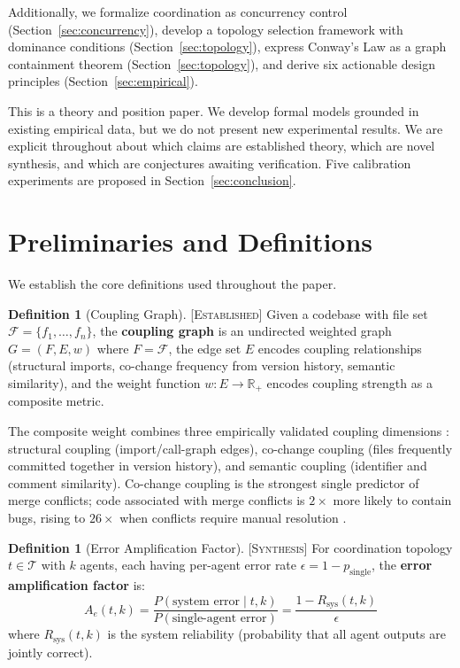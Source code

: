 \documentclass[11pt]{article}
\theoremstyle{definition}
\newtheorem{definition}[theorem]{Definition}
\theoremstyle{remark}
\newcommand{\established}{\textsc{[Established]}}
\newcommand{\synthesis}{\textsc{[Synthesis]}}
\begin{document}
Additionally, we formalize coordination as concurrency control (Section~\ref{sec:concurrency}), develop a topology selection framework with dominance conditions (Section~\ref{sec:topology}), express Conway's Law as a graph containment theorem (Section~\ref{sec:topology}), and derive six actionable design principles (Section~\ref{sec:empirical}).

This is a theory and position paper.
We develop formal models grounded in existing empirical data, but we do not present new experimental results.
We are explicit throughout about which claims are established theory, which are novel synthesis, and which are conjectures awaiting verification.
Five calibration experiments are proposed in Section~\ref{sec:conclusion}.


\section{Preliminaries and Definitions}
\label{sec:prelim}

We establish the core definitions used throughout the paper.

\begin{definition}[Coupling Graph] \established{}
\label{def:coupling-graph}
Given a codebase with file set $\mathcal{F} = \{f_1, \ldots, f_n\}$, the \textbf{coupling graph} is an undirected weighted graph $G = (F, E, w)$ where $F = \mathcal{F}$, the edge set $E$ encodes coupling relationships (structural imports, co-change frequency from version history, semantic similarity), and the weight function $w: E \to \mathbb{R}_+$ encodes coupling strength as a composite metric.
\end{definition}

The composite weight combines three empirically validated coupling dimensions \citep{Martin1994, KasiSarma2013, Accioly2018}: structural coupling (import/call-graph edges), co-change coupling (files frequently committed together in version history), and semantic coupling (identifier and comment similarity).
Co-change coupling is the strongest single predictor of merge conflicts; code associated with merge conflicts is $2\times$ more likely to contain bugs, rising to $26\times$ when conflicts require manual resolution \citep{Accioly2018}.

\begin{definition}[Error Amplification Factor] \synthesis{}
\label{def:error-amp}
For coordination topology $t \in \mathcal{T}$ with $k$ agents, each having per-agent error rate $\epsilon = 1 - p_{\mathrm{single}}$, the \textbf{error amplification factor} is:
\begin{equation}
  A_e(t, k) = \frac{P(\text{system error} \mid t, k)}{P(\text{single-agent error})} = \frac{1 - R_{\mathrm{sys}}(t, k)}{\epsilon}
\end{equation}
where $R_{\mathrm{sys}}(t, k)$ is the system reliability (probability that all agent outputs are jointly correct).
\end{definition}
\end{document}
